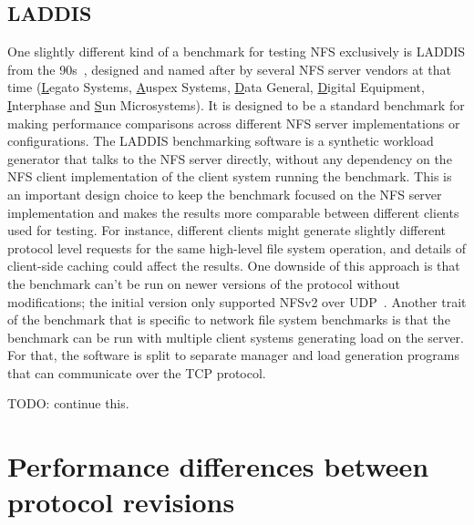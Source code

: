 \subsection{LADDIS}
One slightly different kind of a benchmark for testing NFS exclusively is LADDIS from the 90s~\cite{LADDIS}, designed and named after by
several NFS server vendors at that time (\underline{L}egato Systems, \underline{A}uspex Systems, \underline{D}ata General,
\underline{D}igital Equipment, \underline{I}nterphase and \underline{S}un Microsystems).
It is designed to be a standard benchmark for making performance comparisons across different NFS server implementations or configurations.
The LADDIS benchmarking software is a synthetic workload generator that talks to the NFS server directly,
without any dependency on the NFS client implementation of the client system running the benchmark.
This is an important design choice to keep the benchmark focused on the NFS server implementation and makes the results more comparable
between different clients used for testing.
For instance, different clients might generate slightly different protocol level requests for the same high-level file system operation,
and details of client-side caching could affect the results.
One downside of this approach is that the benchmark can't be run on newer versions of the protocol without modifications;
the initial version only supported NFSv2 over UDP~\cite{MetaStudy}.
Another trait of the benchmark that is specific to network file system benchmarks is that the benchmark can be run with
multiple client systems generating load on the server.
For that, the software is split to separate manager and load generation programs that can communicate over the TCP protocol.

TODO: continue this.

\section{Performance differences between protocol revisions} \label{sect:NFSv41}

